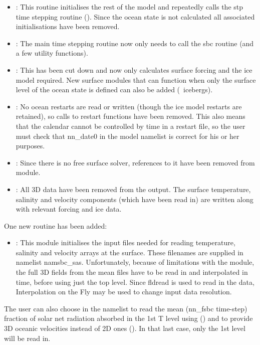 \documentclass[../main/NEMO_manual]{subfiles}
\begin{document}
\begin{itemize}
\item {}: This routine initialises the rest of the model and repeatedly calls the stp time stepping routine ().
  Since the ocean state is not calculated all associated initialisations have been removed.
\item {}: The main time stepping routine now only needs to call the sbc routine (and a few utility functions).
\item {}: This has been cut down and now only calculates surface forcing and the ice model required.
  New surface modules that can function when only the surface level of the ocean state is defined can also be added
  (\eg\ icebergs).
\item {}: No ocean restarts are read or written (though the ice model restarts are retained),
  so calls to restart functions have been removed.
  This also means that the calendar cannot be controlled by time in a restart file,
  so the user must check that nn\_date0 in the model namelist is correct for his or her purposes.
\item {}: Since there is no free surface solver, references to it have been removed from  module.
\item {}: All 3D data have been removed from the output.
  The surface temperature, salinity and velocity components (which have been read in) are written along with
  relevant forcing and ice data.
\end{itemize}

One new routine has been added:

\begin{itemize}
\item {}: This module initialises the input files needed for reading temperature, salinity and
  velocity arrays at the surface.
  These filenames are supplied in namelist namsbc\_sas.
  Unfortunately, because of limitations with the  module,
  the full 3D fields from the mean files have to be read in and interpolated in time,
  before using just the top level.
  Since fldread is used to read in the data, Interpolation on the Fly may be used to change input data resolution.
\end{itemize}

The user can also choose in the  namelist to read the mean (nn\_fsbc time-step) fraction of solar net radiation absorbed in the 1st T level using
 () and to provide 3D oceanic velocities instead of 2D ones (). In that last case, only the 1st level will be read in.
\end{document}
